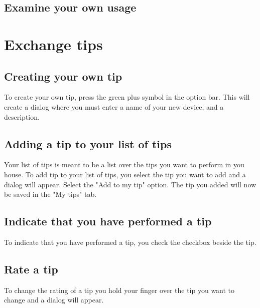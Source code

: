 \subsection{Examine your own usage}


\section{Exchange tips}

\subsection{Creating your own tip}
To create your own tip, press the green plus symbol in the option bar. This will create a dialog where you must enter a name of your new device, and a description. 
\subsection{Adding a tip to your list of tips}
Your list of tips is meant to be a list over the tips you want to perform in you house. To add tip to your list of tips, you select the tip you want to add and a dialog will appear. Select the "Add to my tip" option. The tip you added will now be saved in the "My tips" tab. 
\subsection{Indicate that you have performed a tip}
To indicate that you have performed a tip, you check the checkbox beside the tip.
\subsection{Rate a tip}
To change the rating of a tip you hold your finger over the tip you want to change and a dialog will appear. 

